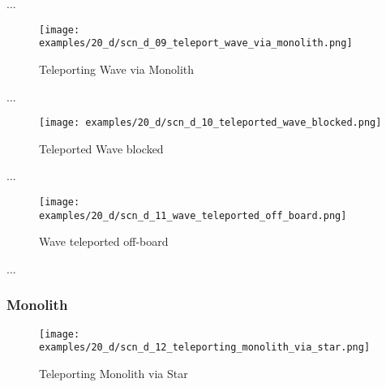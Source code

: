 ...

\clearpage %

\noindent
\begin{figure}[!h]
\texttt{[image: examples/20\_d/scn\_d\_09\_teleport\_wave\_via\_monolith.png]}
\caption{Teleporting Wave via Monolith}
\label{fig:scn_d_09_teleport_wave_via_monolith}
\end{figure}

...

\clearpage %

\noindent
\begin{figure}[!h]
\texttt{[image: examples/20\_d/scn\_d\_10\_teleported\_wave\_blocked.png]}
\caption{Teleported Wave blocked}
\label{fig:scn_d_10_teleported_wave_blocked}
\end{figure}

...

\clearpage %

\noindent
\begin{figure}[!h]
\texttt{[image: examples/20\_d/scn\_d\_11\_wave\_teleported\_off\_board.png]}
\caption{Wave teleported off-board}
\label{fig:scn_d_11_wave_teleported_off_board}
\end{figure}

...

\clearpage %

\subsubsection*{Monolith}

\noindent
\begin{figure}[!h]
\texttt{[image: examples/20\_d/scn\_d\_12\_teleporting\_monolith\_via\_star.png]}
\caption{Teleporting Monolith via Star}
\label{fig:scn_d_12_teleporting_monolith_via_star}
\end{figure}

